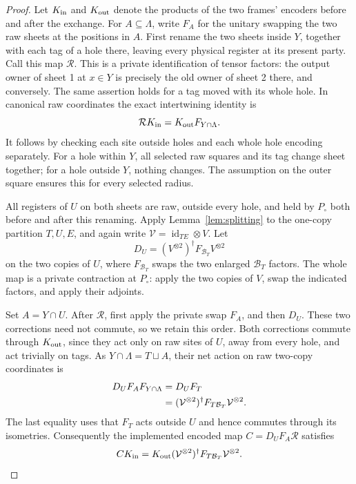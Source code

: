 \documentclass[11pt]{article}
\numberwithin{equation}{section}
\theoremstyle{definition}
\theoremstyle{remark}
\begin{document}
\begin{proof}
Let $K_{\rm in}$ and $K_{\rm out}$ denote the products of the two frames'
encoders before and after the exchange.  For $A\subseteq\Lambda$, write
$F_A$ for the unitary swapping the two raw sheets at the positions in $A$.
First rename the two sheets inside $Y$, together with each tag of a hole
there, leaving every physical register at its present party.  Call this
map $\mathcal R$.  This is a private identification of tensor factors: the
output owner of sheet 1 at $x\in Y$ is precisely the old owner of sheet 2
there, and conversely.  The same assertion holds for a tag moved with its
whole hole.  In canonical raw coordinates the exact intertwining identity
is
\begin{equation}\label{eq:exchange-intertwining}
  \mathcal R K_{\rm in}=K_{\rm out}F_{Y\cap\Lambda}.
\end{equation}
It follows by checking each site outside holes and each whole hole
encoding separately.  For a hole within $Y$, all selected raw squares and
its tag change sheet together; for a hole outside $Y$, nothing changes.
The assumption on the outer square ensures this for every selected radius.

All registers of $U$ on both sheets are raw, outside every hole, and held
by $P_\circ$ both before and after this renaming.  Apply
Lemma~\ref{lem:splitting} to the one-copy partition $T,U,E$, and again write
$\mathcal V=\operatorname{id}_{TE}\otimes V$.  Let
\begin{equation}\label{eq:exchange-buffer-correction}
 D_U=(V^{\otimes2})^{\dagger}F_{\mathcal B_T}V^{\otimes2}
\end{equation}
on the two copies of $U$, where $F_{\mathcal B_T}$ swaps the two enlarged
$\mathcal B_T$ factors.  The whole map is a private contraction at
$P_\circ$: apply the two copies of $V$, swap the indicated factors, and
apply their adjoints.

Set $A=Y\cap U$.  After $\mathcal R$, first apply the private swap $F_A$,
and then $D_U$.  These two corrections need not commute, so we retain this
order.  Both corrections commute through $K_{\rm out}$, since they act
only on raw sites of $U$, away from every hole, and act trivially on tags.
As $Y\cap\Lambda=T\sqcup A$, their net action on raw two-copy coordinates
is
\begin{align}
 D_UF_AF_{Y\cap\Lambda}
   &=D_UF_T\notag\\
   &=(\mathcal V^{\otimes2})^{\dagger}
          F_{T\mathcal B_T}\mathcal V^{\otimes2}.
              \label{eq:exchange-net-map}
\end{align}
The last equality uses that $F_T$ acts outside $U$ and hence commutes
through its isometries.  Consequently the implemented encoded map
$C=D_UF_A\mathcal R$ satisfies
\begin{equation}\label{eq:exchange-exact-map}
 CK_{\rm in}
   =K_{\rm out}(\mathcal V^{\otimes2})^{\dagger}
                   F_{T\mathcal B_T}\mathcal V^{\otimes2}.
\end{equation}


\end{proof}
\end{document}
